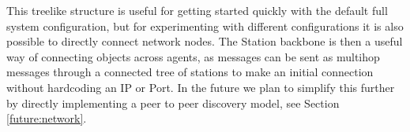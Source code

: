This treelike structure is useful for getting started quickly with the default full system configuration, but for experimenting with different configurations it is also possible to directly connect network nodes. The Station backbone is then a useful way of connecting objects across agents, as messages can be sent as multihop messages through a connected tree of stations to make an initial connection without hardcoding an IP or Port. In the future we plan to simplify this further by directly implementing a peer to peer discovery model, see Section \ref{future:network}. 

\clearpage
